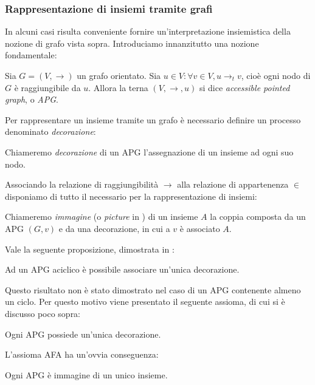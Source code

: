 \subsubsection{Rappresentazione di insiemi tramite grafi}
\label{sec:graphs_sets}
In alcuni casi risulta conveniente fornire un'in\-ter\-pre\-ta\-zio\-ne insiemistica della nozione di grafo vista sopra. Introduciamo innanzitutto una nozione fondamentale:
\begin{definition}
    Sia $G = (V, \to)$ un grafo orientato. Sia $u \in V : \forall v \in V, u \to_t v$, cioè ogni nodo di $G$ è raggiungibile da $u$. Allora la terna $(V, \to, u)$ si dice \emph{accessible pointed graph}, o \emph{APG}.
\end{definition}
Per rappresentare un insieme tramite un grafo è necessario definire un processo denominato \emph{decorazione}:
\begin{definition}
    Chiameremo \emph{decorazione} di un APG l'assegnazione di un insieme ad ogni suo nodo.
\end{definition}
Associando la relazione di raggiungibilità $\to$ alla relazione di appartenenza $\in$ disponiamo di tutto il necessario per la rappresentazione di insiemi:
\begin{definition}
    Chiameremo \emph{immagine} (o \emph{picture} in \cite{aczel}) di un insieme $A$ la coppia composta da un APG $(G,v)$ e da una decorazione, in cui a $v$ è associato $A$.
\end{definition}
Vale la seguente proposizione, dimostrata in \cite{aczel}:
\begin{proposition}
    Ad un APG aciclico è possibile associare un'unica decorazione.
\end{proposition}
Questo risultato non è stato dimostrato nel caso di un APG contenente almeno un ciclo. Per questo motivo viene presentato il seguente assioma, di cui si è discusso poco sopra:
\begin{axiom}
    Ogni APG possiede un'unica decorazione.
\end{axiom}
L'assioma AFA ha un'ovvia conseguenza:
\begin{corollary}
    Ogni APG è immagine di un unico insieme.
\end{corollary}

